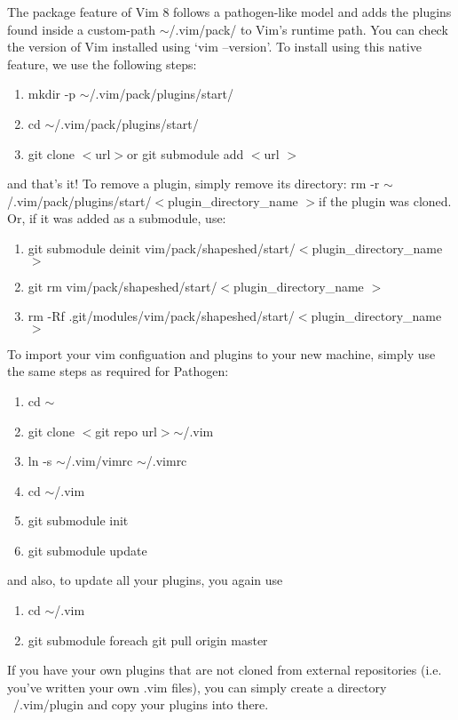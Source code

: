 \documentclass[10pt]{article}
\newcommand{\tsim}{$\sim$}
\newcommand{\tlangle}{$<$}
\newcommand{\trangle}{$>$}
\begin{document}
The package feature of Vim 8 follows a pathogen-like model and adds the plugins
found inside a custom-path \tsim/.vim/pack/ to Vim's runtime path. You can check
the version of Vim installed using `vim --version'. To install using this native
feature, we use the following steps:
\begin{enumerate}
    \item mkdir -p \tsim/.vim/pack/plugins/start/
    \item cd \tsim/.vim/pack/plugins/start/
    \item git clone \tlangle url\trangle or git submodule add \tlangle url
        \trangle
\end{enumerate}
and that's it! To remove a plugin, simply remove its directory: rm -r
\tsim/.vim/pack/plugins/start/\tlangle plugin\_directory\_name \trangle if the
plugin was cloned. Or, if it was added as a submodule, use:
\begin{enumerate}
    \item git submodule deinit vim/pack/shapeshed/start/\tlangle plugin\_directory\_name \trangle
    \item git rm vim/pack/shapeshed/start/\tlangle plugin\_directory\_name \trangle
    \item rm -Rf .git/modules/vim/pack/shapeshed/start/\tlangle plugin\_directory\_name \trangle
\end{enumerate}
To import your vim configuation and plugins to your new machine, simply use the
same steps as required for Pathogen:
\begin{enumerate}
    \item cd \tsim
    \item git clone \tlangle git repo url\trangle \tsim/.vim
    \item ln -s \tsim/.vim/vimrc \tsim/.vimrc
    \item cd \tsim/.vim
    \item git submodule init
    \item git submodule update
\end{enumerate}
and also, to update all your plugins, you again use
\begin{enumerate}
    \item cd \tsim/.vim
    \item git submodule foreach git pull origin master
\end{enumerate}
If you have your own plugins that are not cloned from external repositories
(i.e. you've written your own .vim files), you can simply create a directory
~/.vim/plugin and copy your plugins into there.\\
\end{document}
